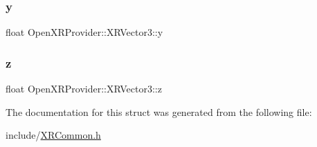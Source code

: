 \subsubsection{\texorpdfstring{y}{y}}
{\footnotesize\ttfamily float Open\+X\+R\+Provider\+::\+X\+R\+Vector3\+::y}

\mbox{\label{struct_open_x_r_provider_1_1_x_r_vector3_a079a1b8f13c5520e7e23f1cbeea57da2}} 
\subsubsection{\texorpdfstring{z}{z}}
{\footnotesize\ttfamily float Open\+X\+R\+Provider\+::\+X\+R\+Vector3\+::z}



The documentation for this struct was generated from the following file\+:\begin{DoxyCompactItemize}
\item 
include/\mbox{\hyperlink{_x_r_common_8h}{X\+R\+Common.\+h}}\end{DoxyCompactItemize}
